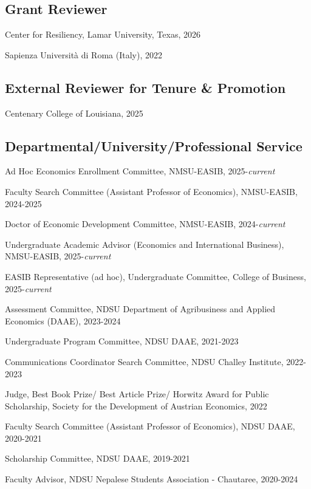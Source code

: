 \documentclass[12pt,letterpaper]{report}
\newcommand{\listitemspace}{0.15em} %
\renewenvironment{itemize}
{\begin{list}{}{\setlength{\leftmargin}{0em}
            \setlength{\parskip}{0em}
            \setlength{\itemsep}{\listitemspace}
            \setlength{\parsep}{\listitemspace}}}
{\end{list}}
\begin{document}
       \subsection*{Grant Reviewer}


          \begin{itemize}
     \item [] Center for Resiliency, Lamar University, Texas, 2026
     \item [] Sapienza Università di Roma (Italy), 2022
	\end{itemize}

      \subsection*{External Reviewer for Tenure \& Promotion}
           \begin{itemize}
     \item [] Centenary College of Louisiana, 2025
	\end{itemize}

    \subsection*{Departmental/University/Professional Service}

    \begin{itemize}
        \item [] Ad Hoc Economics Enrollment Committee, NMSU-EASIB, 2025-\textit{current}
        \item [] Faculty Search Committee (Assistant Professor of Economics), NMSU-EASIB, 2024-2025
        \item [] Doctor of Economic Development Committee, NMSU-EASIB, 2024-\textit{current}
        \item [] Undergraduate Academic Advisor (Economics and International Business), NMSU-EASIB, 2025-\textit{current}
        \item [] EASIB Representative (ad hoc), Undergraduate Committee, College of Business, 2025-\textit{current}
        \item []Assessment Committee, NDSU Department of  Agribusiness and Applied Economics (DAAE), 2023-2024
        \item []Undergraduate Program Committee, NDSU DAAE, 2021-2023
        \item [] Communications Coordinator Search Committee, NDSU Challey Institute, 2022-2023
        \item [] Judge, Best Book Prize/ Best Article Prize/ Horwitz Award for Public Scholarship, Society for the Development of Austrian Economics, 2022
        \item [] Faculty Search Committee (Assistant Professor of Economics), NDSU DAAE, 2020-2021
        \item []Scholarship Committee, NDSU DAAE, 2019-2021
        \item [] Faculty Advisor, NDSU Nepalese Students Association - Chautaree, 2020-2024

	\end{itemize}
\end{document}
